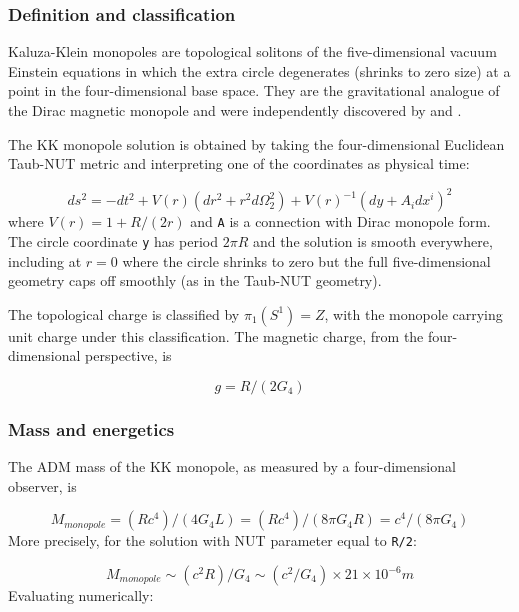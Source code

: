\documentclass[aps,prd,preprint,superscriptaddress,longbibliography,floatfix]{revtex4-2}
\theoremstyle{remark}
\begin{document}
\subsubsection{Definition and classification}

Kaluza-Klein monopoles are topological solitons of the five-dimensional vacuum Einstein equations in which the extra circle degenerates (shrinks to zero size) at a point in the four-dimensional base space. They are the gravitational analogue of the Dirac magnetic monopole and were independently discovered by \cite{SorkinMonopole1983} and \cite{GrossPerryMonopole1983}.

The KK monopole solution is obtained by taking the four-dimensional Euclidean Taub-NUT metric and interpreting one of the coordinates as physical time:


\begin{equation}
    ds^{2} = -dt^{2} + V(r)(dr^{2} + r^{2} d\Omega_{2}^{2}) + V(r)^{-1}(dy + A_i dx^i)^{2}
\end{equation}
where $V(r) = 1 + R/(2r)$ and \texttt{A} is a connection with Dirac monopole form. The circle coordinate \texttt{y} has period $2\pi R$ and the solution is smooth everywhere, including at $r = 0$ where the circle shrinks to zero but the full five-dimensional geometry caps off smoothly (as in the Taub-NUT geometry).

The topological charge is classified by $\pi_{1}(S^{1}) = Z$, with the monopole carrying unit charge under this classification. The magnetic charge, from the four-dimensional perspective, is


\begin{equation}
    g = R / (2 G_{4})
\end{equation}

\subsubsection{Mass and energetics}

The ADM mass of the KK monopole, as measured by a four-dimensional observer, is


\begin{equation}
    M_{monopole} = (R c^{4}) / (4 G_{4} L) = (R c^{4}) / (8\pi G_{4} R) = c^{4} / (8\pi G_{4})
\end{equation}
More precisely, for the solution with NUT parameter equal to \texttt{R/2}:


\begin{equation}
    M_{monopole} \sim  (c^{2} R) / G_{4} \sim  (c^{2} / G_{4}) \times 21 \times 10^{-6} m
\end{equation}
Evaluating numerically:
\end{document}
